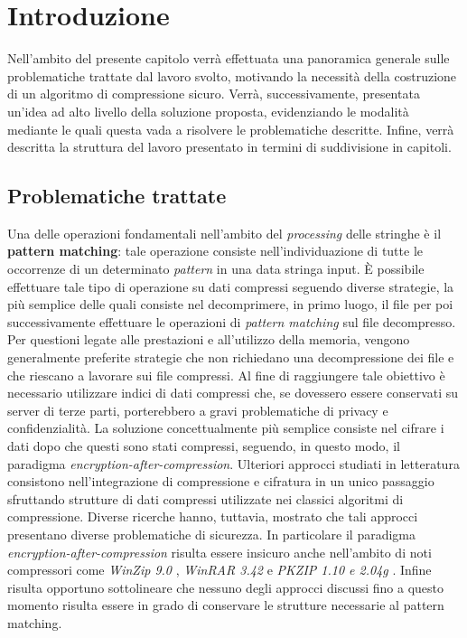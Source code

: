 \chapter{Introduzione}

\begin{citazione}
Nell'ambito del presente capitolo verrà effettuata una panoramica generale sulle problematiche trattate dal lavoro svolto, motivando la necessità della costruzione di un algoritmo di compressione sicuro. Verrà, successivamente, presentata un'idea ad alto livello della soluzione proposta, evidenziando le modalità mediante le quali questa vada a risolvere le problematiche descritte. Infine, verrà descritta la struttura del lavoro presentato in termini di suddivisione in capitoli. 
\end{citazione}
\newpage

\section{Problematiche trattate}
Una delle operazioni fondamentali nell'ambito del \emph{processing} delle stringhe è il \textbf{pattern matching}: tale operazione consiste nell'individuazione di tutte le occorrenze di un determinato \emph{pattern} in una data stringa input. È possibile effettuare tale tipo di operazione su dati compressi seguendo diverse strategie, la più semplice delle quali consiste nel decomprimere, in primo luogo, il file per poi successivamente effettuare le operazioni di \emph{pattern matching} sul file decompresso. Per questioni legate alle prestazioni e all'utilizzo della memoria, vengono generalmente preferite strategie che non richiedano una decompressione dei file e che riescano a lavorare sui file compressi. Al fine di raggiungere tale obiettivo è necessario utilizzare indici di dati compressi che, se dovessero essere conservati su server di terze parti, porterebbero a gravi problematiche di privacy e confidenzialità. La soluzione concettualmente più semplice consiste nel cifrare i dati dopo che questi sono stati compressi, seguendo, in questo modo, il paradigma \emph{encryption-after-compression}. Ulteriori approcci studiati in letteratura consistono nell'integrazione di compressione e cifratura in un unico passaggio sfruttando strutture di dati compressi utilizzate nei classici algoritmi di compressione. Diverse ricerche hanno, tuttavia, mostrato che tali approcci presentano diverse problematiche di sicurezza. In particolare il paradigma \emph{encryption-after-compression} risulta essere insicuro anche nell'ambito di noti compressori come \emph{WinZip 9.0} \cite{kohno2004attacking} \cite{phong2010password}, \emph{WinRAR 3.42} \cite{yeo2006security} e \emph{PKZIP 1.10 e 2.04g} \cite{stay2001zip} \cite{biham1994known}. Infine risulta opportuno sottolineare che nessuno degli approcci discussi fino a questo momento risulta essere in grado di conservare le strutture necessarie al pattern matching.
